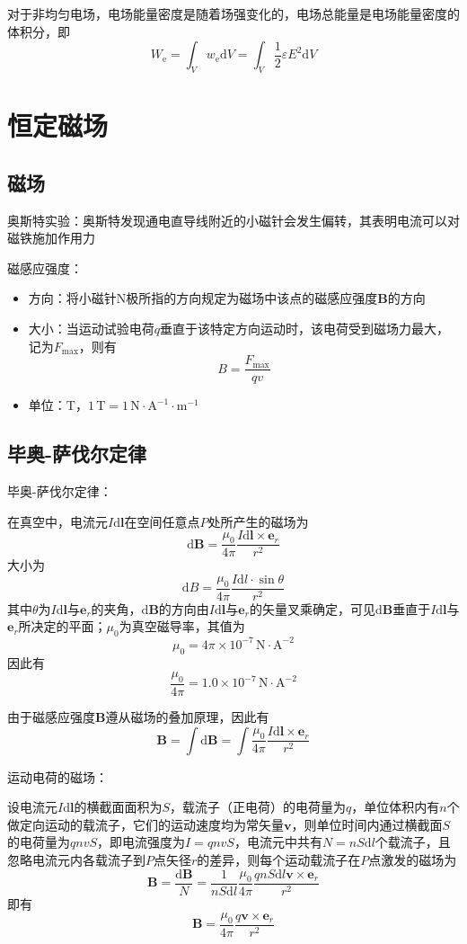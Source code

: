 \documentclass[12pt, a4paper, twoside]{ctexbook}
\begin{document}
对于非均匀电场，电场能量密度是随着场强变化的，电场总能量是电场能量密度的体积分，即
$$
W_\mathrm{e}=\int_V w_\mathrm{e}\mathrm{d}V=\int_V \frac{1}{2}\varepsilon E^2\mathrm{d}V
$$
\chapter{恒定磁场}
\newpage
\section{磁场}
{\sonti 奥斯特实验}：奥斯特发现通电直导线附近的小磁针会发生偏转，其表明电流可以对磁铁施加作用力

{\sonti 磁感应强度}：
\begin{itemize}
    \item 方向：将小磁针$\mathrm{N}$极所指的方向规定为磁场中该点的磁感应强度$\boldsymbol{B}$的方向
    \item 大小：当运动试验电荷$q$垂直于该特定方向运动时，该电荷受到磁场力最大，记为$F_\mathrm{max}$，则有
    $$
    B=\frac{F_\mathrm{max}}{qv}
    $$
    \item 单位：$\mathrm{T}$，$1\,\mathrm{T}=1\,\mathrm{N}\cdot\mathrm{A}^{-1}\cdot\mathrm{m}^{-1}$
\end{itemize}
\section{毕奥-萨伐尔定律}
{\sonti 毕奥-萨伐尔定律}：

在真空中，电流元$I\mathrm{d}\boldsymbol{l}$在空间任意点$P$处所产生的磁场为
$$
\mathrm{d}\boldsymbol{B}=\frac{\mu_0}{4\pi}\frac{I\mathrm{d}\boldsymbol{l}\times\boldsymbol{e}_r}{r^2}
$$
大小为
$$
\mathrm{d}B=\frac{\mu_0}{4\pi}\frac{I\mathrm{d}l\cdot\sin\theta}{r^2}
$$
其中$\theta$为$I\mathrm{d}\boldsymbol{l}$与$\boldsymbol{e}_r$的夹角，$\mathrm{d}\boldsymbol{B}$的方向由$I\mathrm{d}\boldsymbol{l}$与$\boldsymbol{e}_r$的矢量叉乘确定，可见$\mathrm{d}\boldsymbol{B}$垂直于$I\mathrm{d}\boldsymbol{l}$与$\boldsymbol{e}_r$所决定的平面；$\mu_0$为真空磁导率，其值为
$$
\mu_0=4\pi\times10^{-7}\,\mathrm{N}\cdot\mathrm{A}^{-2}
$$
因此有
$$
\frac{\mu_0}{4\pi}=1.0\times10^{-7}\,\mathrm{N}\cdot\mathrm{A}^{-2}
$$

由于磁感应强度$\boldsymbol{B}$遵从磁场的叠加原理，因此有
$$
\boldsymbol{B}=\int\mathrm{d}\boldsymbol{B}=\int\frac{\mu_0}{4\pi}\frac{I\mathrm{d}\boldsymbol{l}\times\boldsymbol{e}_r}{r^2}
$$

{\sonti 运动电荷的磁场}：

设电流元$I\mathrm{d}\boldsymbol{l}$的横截面面积为$S$，载流子（正电荷）的电荷量为$q$，单位体积内有$n$个做定向运动的载流子，它们的运动速度均为常矢量$\boldsymbol{v}$，则单位时间内通过横截面$S$的电荷量为$qnvS$，即电流强度为$I=qnvS$，电流元中共有$N=nS\mathrm{d}l$个载流子，且忽略电流元内各载流子到$P$点矢径$r$的差异，则每个运动载流子在$P$点激发的磁场为
$$
\boldsymbol{B}=\frac{\mathrm{d}\boldsymbol{B}}{N}=\frac{1}{nS\mathrm{d}l}\frac{\mu_0}{4\pi}\frac{qnS\mathrm{d}l\boldsymbol{v}\times\boldsymbol{e}_r}{r^2}
$$
即有
$$
\boldsymbol{B}=\frac{\mu_0}{4\pi}\frac{q\boldsymbol{v}\times\boldsymbol{e}_r}{r^2}
$$
\end{document}
